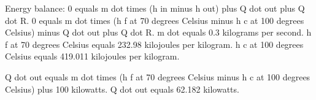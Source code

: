 Energy balance:  
0 equals m dot times (h in minus h out) plus Q dot out plus Q dot R.  
0 equals m dot times (h f at 70 degrees Celsius minus h c at 100 degrees Celsius) minus Q dot out plus Q dot R.  
m dot equals 0.3 kilograms per second.  
h f at 70 degrees Celsius equals 232.98 kilojoules per kilogram.  
h c at 100 degrees Celsius equals 419.011 kilojoules per kilogram.  

Q dot out equals m dot times (h f at 70 degrees Celsius minus h c at 100 degrees Celsius) plus 100 kilowatts.  
Q dot out equals 62.182 kilowatts.